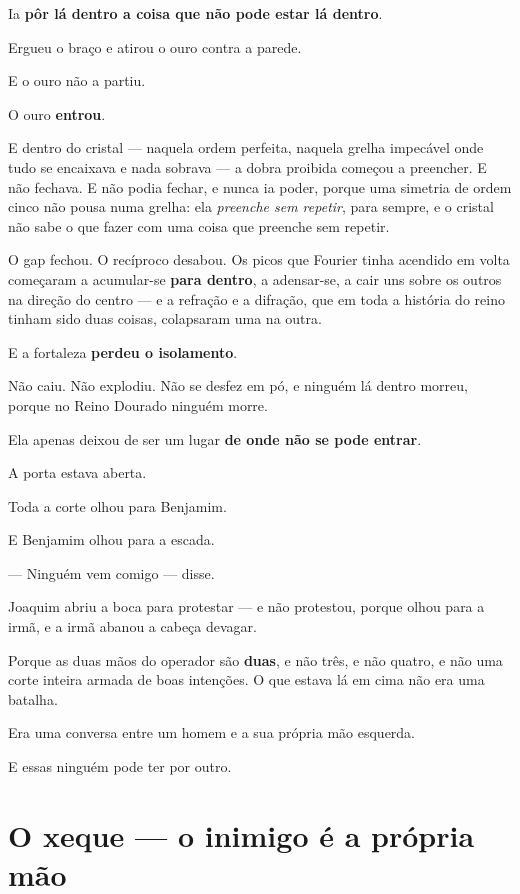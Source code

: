 \documentclass[livro.tex]{subfiles}
\begin{document}
Ia \textbf{pôr lá dentro a coisa que não pode estar lá dentro}.

\medskip

Ergueu o braço e atirou o ouro contra a parede.

E o ouro não a partiu.

O ouro \textbf{entrou}.

E dentro do cristal --- naquela ordem perfeita, naquela grelha impecável onde tudo se encaixava e nada sobrava --- a
dobra proibida começou a preencher. E não fechava. E não podia fechar, e nunca ia poder, porque uma simetria de
ordem cinco não pousa numa grelha: ela \emph{preenche sem repetir}, para sempre, e o cristal não sabe o que fazer
com uma coisa que preenche sem repetir.

O gap fechou. O recíproco desabou. Os picos que Fourier tinha acendido em volta
começaram a acumular-se \textbf{para dentro}, a adensar-se, a cair uns sobre os outros na direção do centro --- e a
refração e a difração, que em toda a história do reino tinham sido duas coisas, colapsaram uma na outra.

E a fortaleza \textbf{perdeu o isolamento}.

\medskip

Não caiu. Não explodiu. Não se desfez em pó, e ninguém lá dentro morreu, porque no Reino Dourado ninguém morre.

Ela apenas deixou de ser um lugar \textbf{de onde não se pode entrar}.

A porta estava aberta.

\medskip

Toda a corte olhou para Benjamim.

E Benjamim olhou para a escada.

--- Ninguém vem comigo --- disse.

Joaquim abriu a boca para protestar --- e não protestou, porque olhou para a irmã, e a irmã abanou a cabeça
devagar.

Porque as duas mãos do operador são \textbf{duas}, e não três, e não quatro, e não uma corte inteira armada de boas
intenções. O que estava lá em cima não era uma batalha.

Era uma conversa entre um homem e a sua própria mão esquerda.

E essas ninguém pode ter por outro.


\chapter{O xeque --- o inimigo é a própria mão}
\end{document}
